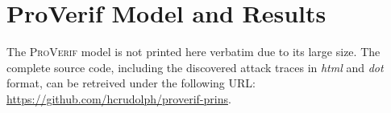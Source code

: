 \section*{ProVerif Model and Results}

The \textsc{ProVerif} model is not printed here verbatim due to its large size.
The complete source code, including the discovered attack traces in \textit{html} and \textit{dot} format, can be retreived under the following URL: \url{https://github.com/hcrudolph/proverif-prins}.